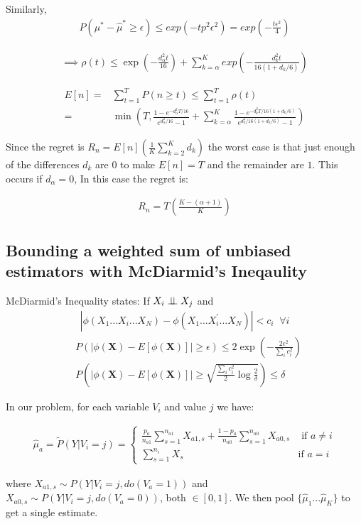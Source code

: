 \documentclass{article}
\newcommand{\eqn}[1]{\begin{align}#1\end{align}}
\theoremstyle{plain}
\theoremstyle{definition}
\begin{document}
Similarly, 
\eqn {
P(\mu^* - \hat{\mu}^* \geq \epsilon) \leq exp(-tp^2\epsilon^2) = exp(-\frac{t\epsilon^2}{4})
}

\eqn {
\implies \rho(t) \leq \exp(-\frac{ d_\alpha^2 t}{16}) + \sum_{k=\alpha}^K exp(-\frac{d_k^2 t}{16(1+d_k/6)})
}


\eqn{ 
E[n] = & \sum_{t=1}^T P(n \geq t) \leq \sum_{t=1}^T \rho(t) \\
= & \min \left(T, \frac{1 - e^{-d_\alpha^2 T/16}}{e^{d_\alpha^2 /16} -1 } +  \sum_{k=\alpha}^K \frac{1 - e^{-d_k^2 T/16(1+d_k/6)}}{e^{d_k^2 /16(1+d_k/6)} -1 } \right)
}

Since the regret is $R_n = E[n]\left(\frac{1}{K}\sum_{k=2}^K d_k \right)$ the worst case is that just enough of the differences $d_k$ are $0$ to make $E[n] = T$ and the remainder are $1$. This occurs if $d_\alpha = 0$, In this case the regret is:

\eqn {
R_n = T \left(\frac{K-(\alpha+1)}{K}\right)
}








\subsection{Bounding a weighted sum of unbiased estimators with McDiarmid's Ineqaulity}

McDiarmid's Inequality states:
If $X_i \perp\!\!\!\perp X_j$ and 
\eqn{
|\phi(X_1...X_i...X_N) - \phi(X_1...X_i^{'}...X_N)| < c_i \;\; \forall i
}
\eqn{
& P\left(|\phi(\boldsymbol{X}) - E[\phi(\boldsymbol{X})]| \geq \epsilon \right) \leq 2 \exp \left(-\frac{2 \epsilon^2}{\sum_{i}c_i^2} \right)\\
\label{eqn:McDiarmid}
& P\left(|\phi(\boldsymbol{X}) - E[\phi(\boldsymbol{X})]| \geq 
\sqrt{\frac{\sum_{i}c_i^2}{2}\log{\frac{2}{\delta}}} 
\right) \leq \delta
}


In our problem, for each variable $V_i$ and value $j$ we have:

\eqn{
\hat{\mu}_a = \tilde{P}(Y|V_i = j)= \begin{cases}
\frac{p_a}{n_{a1}}\sum_{s=1}^{n_{a1}}X_{a1,s} + \frac{1-p_a}{n_{a0}}\sum_{s=1}^{n_{a0}}X_{a0,s} & \text{ if $a \neq i$}\\
\sum_{s=1}^{n_i}X_s & \text{if $a = i$}
\end{cases}
}

where $X_{a1,s}  \sim P(Y|V_i = j, do(V_a = 1))$ and $X_{a0,s}  \sim P(Y|V_i = j, do(V_a = 0))$, both $\in [0,1]$. We then pool $\{\hat{\mu}_1 ... \hat{\mu}_K \}$ to get a single estimate.
\end{document}

